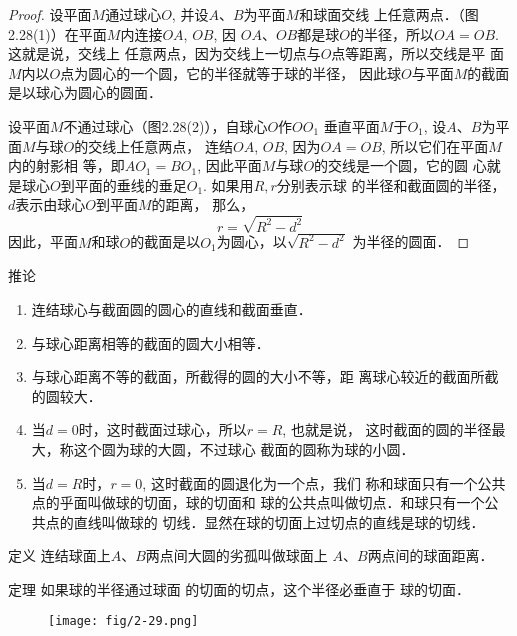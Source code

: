 \begin{proof}
    设平面$M$通过球心$O$, 并设$A$、$B$为平面$M$和球面交线
    上任意两点．（图2.28(1)）在平面$M$内连接$OA$, $OB$, 因
    $OA$、$OB$都是球$O$的半径，所以$OA=OB$. 这就是说，交线上
    任意两点，因为交线上一切点与$O$点等距离，所以交线是平
    面$M$内以$O$点为圆心的一个圆，它的半径就等于球的半径，
    因此球$O$与平面$M$的截面是以球心为圆心的圆面．

设平面$M$不通过球心（图2.28(2)），自球心$O$作$OO_1$
    垂直平面$M$于$O_1$, 设$A$、$B$为平面$M$与球$O$的交线上任意两点，
    连结$OA$, $OB$, 因为$OA=OB$, 所以它们在平面$M$内的射影相
    等，即$AO_1=BO_1$, 因此平面$M$与球$O$的交线是一个圆，它的圆
    心就是球心$O$到平面的垂线的垂足$O_1$. 如果用$R,r$分别表示球
    的半径和截面圆的半径，$d$表示由球心$O$到平面$M$的距离，
那么，
\[r=\sqrt{R^2-d^2}\]
因此，平面$M$和球$O$的截面是以$O_1$为圆心，以$\sqrt{R^2-d^2}$
为半径的圆面．
\end{proof}

\begin{blk}{推论}
\begin{enumerate}
\item 连结球心与截面圆的圆心的直线和截面垂直．
\item 与球心距离相等的截面的圆大小相等．
\item 与球心距离不等的截面，所截得的圆的大小不等，距
离球心较近的截面所截的圆较大．
\item 当$d=0$时，这时截面过球心，所以$r=R$, 也就是说，
这时截面的圆的半径最大，称这个圆为球的大圆，不过球心
截面的圆称为球的小圆．
\item 当$d=R$时，$r=0$, 这时截面的圆退化为一个点，我们
称和球面只有一个公共点的乎面叫做球的切面，球的切面和
球的公共点叫做切点．和球只有一个公共点的直线叫做球的
切线．显然在球的切面上过切点的直线是球的切线．
\end{enumerate}
    
\end{blk}

\begin{blk}{定义} 
    连结球面上$A$、$B$两点间大圆的劣孤叫做球面上
$A$、$B$两点间的球面距离．
\end{blk}

\begin{blk}
    {定理} 如果球的半径通过球面
    的切面的切点，这个半径必垂直于
    球的切面．
\end{blk}

\begin{figure}[htp]
    \centering
\texttt{[image: fig/2-29.png]}
    \caption{}
\end{figure}


